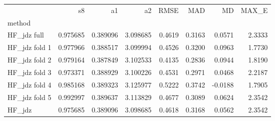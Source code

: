 \begin{tabular}{lrrrrrrr}
 & s8 & a1 & a2 & RMSE & MAD & MD & MAX_E \\
method &  &  &  &  &  &  &  \\
HF_jdz full & 0.975685 & 0.389096 & 3.098685 & 0.4619 & 0.3163 & 0.0571 & 2.3333 \\
HF_jdz fold 1 & 0.977966 & 0.388517 & 3.099994 & 0.4526 & 0.3200 & 0.0963 & 1.7730 \\
HF_jdz fold 2 & 0.979164 & 0.387849 & 3.102533 & 0.4135 & 0.2836 & 0.0944 & 1.8190 \\
HF_jdz fold 3 & 0.973371 & 0.388929 & 3.100226 & 0.4531 & 0.2971 & 0.0468 & 2.2187 \\
HF_jdz fold 4 & 0.985168 & 0.389323 & 3.125977 & 0.5222 & 0.3742 & -0.0188 & 1.7905 \\
HF_jdz fold 5 & 0.992997 & 0.389637 & 3.113829 & 0.4677 & 0.3089 & 0.0624 & 2.3542 \\
HF_jdz & 0.975685 & 0.389096 & 3.098685 & 0.4618 & 0.3168 & 0.0562 & 2.3542 \\
\end{tabular}
